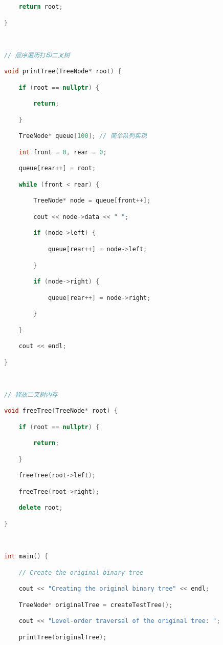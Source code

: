 \begin{lstlisting}[language=C++]
    return root;

}

  

// 层序遍历打印二叉树

void printTree(TreeNode* root) {

    if (root == nullptr) {

        return;

    }

    TreeNode* queue[100]; // 简单队列实现

    int front = 0, rear = 0;

    queue[rear++] = root;

    while (front < rear) {

        TreeNode* node = queue[front++];

        cout << node->data << " ";

        if (node->left) {

            queue[rear++] = node->left;

        }

        if (node->right) {

            queue[rear++] = node->right;

        }

    }

    cout << endl;

}

  

// 释放二叉树内存

void freeTree(TreeNode* root) {

    if (root == nullptr) {

        return;

    }

    freeTree(root->left);

    freeTree(root->right);

    delete root;

}

  

int main() {

    // Create the original binary tree

    cout << "Creating the original binary tree" << endl;

    TreeNode* originalTree = createTestTree();

    cout << "Level-order traversal of the original tree: ";

    printTree(originalTree);

  


\end{lstlisting}
